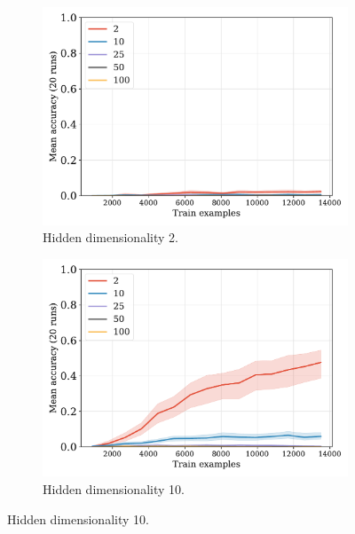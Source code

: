 \documentclass[12pt]{article}
\begin{document}
\begin{figure}[H]
  \centering

  \begin{subfigure}{0.45\linewidth}
    \includegraphics[width=1\textwidth]{fig/fuzzy-lm-vocab10-train_size-embed_dim-hidden_dim=2.pdf}
    \caption{Hidden dimensionality 2.}
  \end{subfigure}
  \hfill
  \begin{subfigure}{0.45\linewidth}
    \includegraphics[width=1\textwidth]{fig/fuzzy-lm-vocab10-train_size-embed_dim-hidden_dim=10.pdf}
    \caption{Hidden dimensionality 10.}
  \end{subfigure}


\end{figure}
\end{document}
